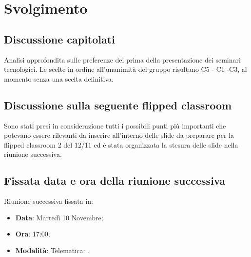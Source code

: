\documentclass[]{article}
\begin{document}
	\newpage

	\section{Svolgimento}
		\subsection{Discussione capitolati}
		 Analisi approfondita sulle preferenze dei  prima della presentazione dei seminari tecnologici. Le scelte in ordine all'unanimità del gruppo risultano C5 - C1 -C3, al momento senza una scelta definitiva.\\
	
		\subsection{Discussione sulla seguente flipped classroom}
		Sono stati presi in considerazione tutti i possibili punti più importanti che potevano essere rilevanti da inserire all'interno delle slide da preparare per la flipped classroom 2  del 12/11 ed è stata organizzata la stesura delle slide nella riunione successiva.\\
		
		\subsection{Fissata data e ora della riunione successiva}
		Riunione successiva fissata in:
		\begin{itemize}
			\item \textbf{Data}: Martedì 10 Novembre;
			\item \textbf{Ora}: 17:00;
			\item \textbf{Modalità}: Telematica: .
		\end{itemize}
\end{document}
